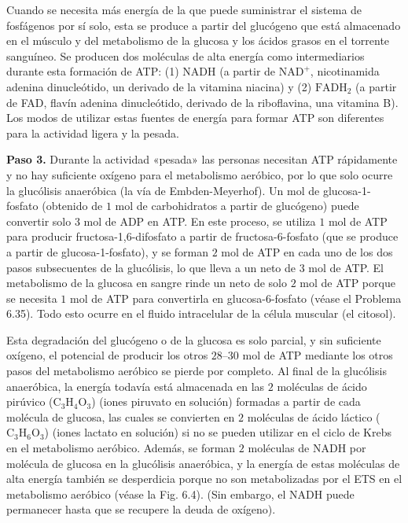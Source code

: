 \documentclass[12pt]{book}
\begin{document}
Cuando se necesita más energía de la que puede suministrar el sistema de fosfágenos por sí solo, esta se produce a partir del glucógeno que está almacenado en el músculo y del metabolismo de la glucosa y los ácidos grasos en el torrente sanguíneo. Se producen dos moléculas de alta energía como intermediarios durante esta formación de ATP: (1) NADH (a partir de $\text{NAD}^+$, nicotinamida adenina dinucleótido, un derivado de la vitamina niacina) y (2) $\text{FADH}_2$ (a partir de FAD, flavín adenina dinucleótido, derivado de la riboflavina, una vitamina B). Los modos de utilizar estas fuentes de energía para formar ATP son diferentes para la actividad ligera y la pesada.

\textbf{Paso 3.} Durante la actividad «pesada» las personas necesitan ATP rápidamente y no hay suficiente oxígeno para el metabolismo aeróbico, por lo que solo ocurre la glucólisis anaeróbica (la vía de Embden-Meyerhof). Un mol de glucosa-1-fosfato (obtenido de $1\text{ mol}$ de carbohidratos a partir de glucógeno) puede convertir solo $3\text{ mol}$ de ADP en ATP. En este proceso, se utiliza $1\text{ mol}$ de ATP para producir fructosa-1,6-difosfato a partir de fructosa-6-fosfato (que se produce a partir de glucosa-1-fosfato), y se forman $2\text{ mol}$ de ATP en cada uno de los dos pasos subsecuentes de la glucólisis, lo que lleva a un neto de $3\text{ mol}$ de ATP. El metabolismo de la glucosa en sangre rinde un neto de solo $2\text{ mol}$ de ATP porque se necesita $1\text{ mol}$ de ATP para convertirla en glucosa-6-fosfato (véase el Problema 6.35). Todo esto ocurre en el fluido intracelular de la célula muscular (el citosol).

Esta degradación del glucógeno o de la glucosa es solo parcial, y sin suficiente oxígeno, el potencial de producir los otros $28\text{--}30\text{ mol}$ de ATP mediante los otros pasos del metabolismo aeróbico se pierde por completo. Al final de la glucólisis anaeróbica, la energía todavía está almacenada en las $2$ moléculas de ácido pirúvico ($\text{C}_3\text{H}_4\text{O}_3$) (iones piruvato en solución) formadas a partir de cada molécula de glucosa, las cuales se convierten en $2$ moléculas de ácido láctico ($\text{C}_3\text{H}_6\text{O}_3$) (iones lactato en solución) si no se pueden utilizar en el ciclo de Krebs en el metabolismo aeróbico. Además, se forman $2$ moléculas de NADH por molécula de glucosa en la glucólisis anaeróbica, y la energía de estas moléculas de alta energía también se desperdicia porque no son metabolizadas por el ETS en el metabolismo aeróbico (véase la Fig. 6.4). (Sin embargo, el NADH puede permanecer hasta que se recupere la deuda de oxígeno).
\end{document}
